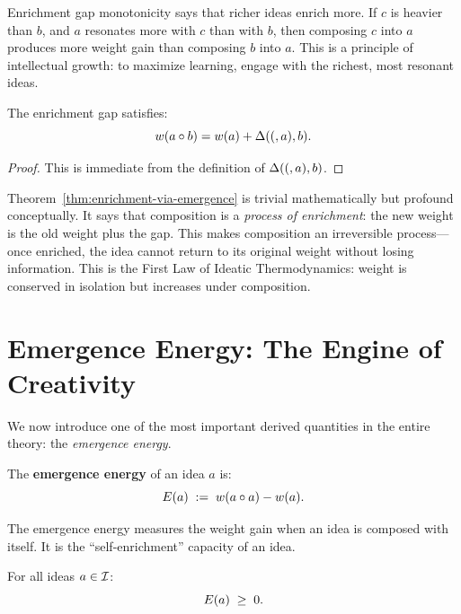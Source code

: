 \begin{remark}
Enrichment gap monotonicity says that richer ideas enrich more. If $c$ is
heavier than $b$, and $a$ resonates more with $c$ than with $b$, then composing
$c$ into $a$ produces more weight gain than composing $b$ into $a$. This is
a principle of intellectual growth: to maximize learning, engage with the
richest, most resonant ideas.
\end{remark}

\begin{theorem}
\label{thm:enrichment-via-emergence}
The enrichment gap satisfies:
\[
  w(a \circ b) = w(a) + \Delta((,a),b).
\]
\end{theorem}

\begin{proof}
This is immediate from the definition of $\Delta((,a),b)$.
\end{proof}

\begin{interpretation}
Theorem~\ref{thm:enrichment-via-emergence} is trivial mathematically but profound
conceptually. It says that composition is a \emph{process of enrichment}: the new
weight is the old weight plus the gap. This makes composition an irreversible
process---once enriched, the idea cannot return to its original weight without
losing information. This is the First Law of Ideatic Thermodynamics: weight is
conserved in isolation but increases under composition.
\end{interpretation}


\section{Emergence Energy: The Engine of Creativity}

We now introduce one of the most important derived quantities in the entire theory:
the \emph{emergence energy}.

\begin{definition}
\label{def:emergence-energy}
The \textbf{emergence energy} of an idea $a$ is:
\[
  E(a) \;:=\; w(a \circ a) - w(a).
\]
\end{definition}

The emergence energy measures the weight gain when an idea is composed with itself.
It is the ``self-enrichment'' capacity of an idea.

\begin{theorem}
\label{thm:emergence-energy-nonneg}
For all ideas $a \in \mathcal{I}$:
\[
  E(a) \;\geq\; 0.
\]
\end{theorem}

